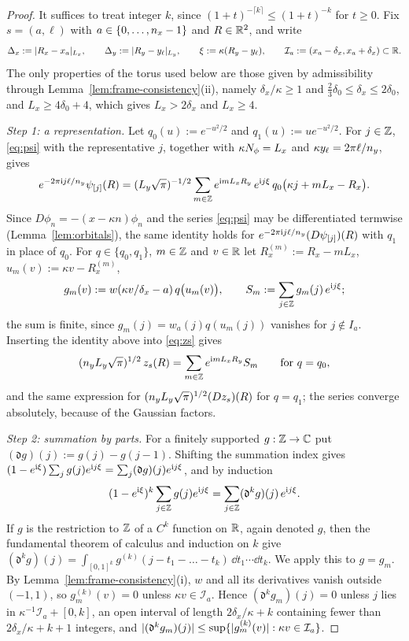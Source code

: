 \begin{proof}
It suffices to treat integer $k$, since $(1+t)^{-\lceil k\rceil}\le(1+t)^{-k}$ for $t\ge0$. Fix $s=(a,\ell)$ with
$a\in\{0,\dots,n_x-1\}$ and $R\in\mathbb{R}^2$, and write
\[
\Delta_x:=\lvert R_x-x_a\rvert_{L_x},\qquad\Delta_y:=\lvert R_y-y_\ell\rvert_{L_y},\qquad\xi:=\kappa(R_y-y_\ell),\qquad
\mathcal I_a:=(x_a-\delta_x,x_a+\delta_x)\subset\mathbb{R} .
\]
The only properties of the torus used below are those given by admissibility through
Lemma~\ref{lem:frame-consistency}(ii), namely $\delta_x/\kappa\ge1$ and $\frac23\delta_0\le\delta_x\le2\delta_0$, and
$L_x\ge4\delta_0+4$, which gives $L_x>2\delta_x$ and $L_x\ge4$.

\emph{Step 1: a representation.} Let $q_0(u):=e^{-u^2/2}$ and $q_1(u):=ue^{-u^2/2}$. For $j\in\mathbb{Z}$, \eqref{eq:psi}
with the representative $j$, together with $\kappa N_{\phi}=L_x$ and $\kappa y_\ell=2\pi\ell/n_y$, gives
\[
e^{-2\pi\mathrm{i} j\ell/n_y}\psi_{[j]}(R)=(L_y\sqrt\pi)^{-1/2}\sum_{m\in\mathbb{Z}}e^{\mathrm{i} mL_xR_y}\,e^{\mathrm{i} j\xi}\,q_0\bigl(\kappa j+mL_x-R_x\bigr).
\]
Since $D\phi_n=-(x-\kappa n)\phi_n$ and the series \eqref{eq:psi} may be differentiated termwise
(Lemma~\ref{lem:orbitals}), the same identity holds for $e^{-2\pi\mathrm{i} j\ell/n_y}(D\psi_{[j]})(R)$ with $q_1$ in place of
$q_0$. For $q\in\{q_0,q_1\}$, $m\in\mathbb{Z}$ and $v\in\mathbb{R}$ let $R^{(m)}_x:=R_x-mL_x$, $u_m(v):=\kappa v-R^{(m)}_x$,
\[
g_m(v):=w(\kappa v/\delta_x-a)\,q\bigl(u_m(v)\bigr),\qquad S_m:=\sum_{j\in\mathbb{Z}}g_m(j)\,e^{\mathrm{i} j\xi};
\]
the sum is finite, since $g_m(j)=w_a(j)q(u_m(j))$ vanishes for $j\notin I_a$. Inserting the identity above into
\eqref{eq:zs} gives
\begin{equation}\label{eq:zs-images}
(n_y L_y\sqrt\pi)^{1/2}\,z_s(R)=\sum_{m\in\mathbb{Z}}e^{\mathrm{i} mL_xR_y}S_m\qquad\text{for }q=q_0,
\end{equation}
and the same expression for $(n_y L_y\sqrt\pi)^{1/2}(Dz_s)(R)$ for $q=q_1$; the series converge absolutely,
because of the Gaussian factors.

\emph{Step 2: summation by parts.} For a finitely supported $g:\mathbb{Z}\to\mathbb{C}$ put $(\mathfrak dg)(j):=g(j)-g(j-1)$.
Shifting the summation index gives $(1-e^{\mathrm{i}\xi})\sum_jg(j)e^{\mathrm{i} j\xi}=\sum_j(\mathfrak dg)(j)e^{\mathrm{i} j\xi}$, and by
induction
\[
(1-e^{\mathrm{i}\xi})^k\sum_{j\in\mathbb{Z}}g(j)e^{\mathrm{i} j\xi}=\sum_{j\in\mathbb{Z}}(\mathfrak d^kg)(j)\,e^{\mathrm{i} j\xi}.
\]
If $g$ is the restriction to $\mathbb{Z}$ of a $C^k$ function on $\mathbb{R}$, again denoted $g$, then the fundamental theorem of
calculus and induction on $k$ give $(\mathfrak d^kg)(j)=\int_{[0,1]^k}g^{(k)}(j-t_1-\dots-t_k)\,\dd t_1\cdots\dd t_k$. We
apply this to $g=g_m$. By Lemma~\ref{lem:frame-consistency}(i), $w$ and all its derivatives vanish outside $(-1,1)$,
so $g_m^{(k)}(v)=0$ unless $\kappa v\in\mathcal I_a$. Hence $(\mathfrak d^kg_m)(j)=0$ unless $j$ lies in
$\kappa^{-1}\mathcal I_a+[0,k]$, an open interval of length $2\delta_x/\kappa+k$ containing fewer than
$2\delta_x/\kappa+k+1$ integers, and $\lvert(\mathfrak d^kg_m)(j)\rvert\le\sup\{\lvert g_m^{(k)}(v)\rvert:\kappa v\in\mathcal I_a\}$.


\end{proof}
